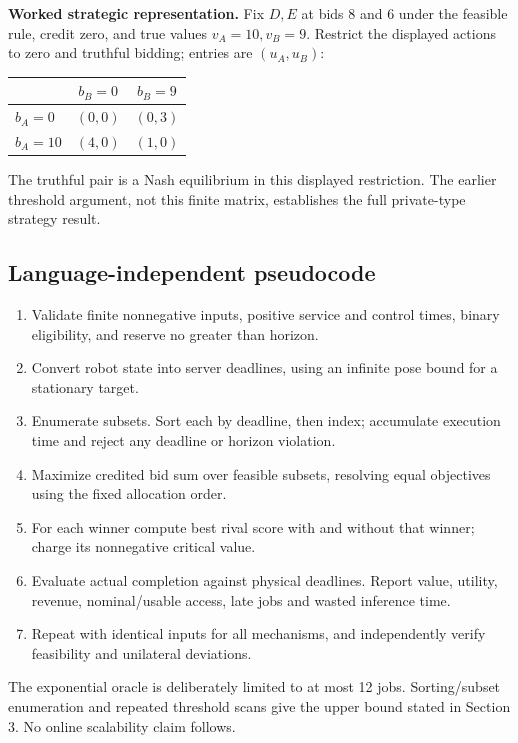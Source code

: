 \textbf{Worked strategic representation.} Fix $D,E$ at bids 8 and 6 under the feasible rule, credit zero, and true values $v_A=10,v_B=9$. Restrict the displayed actions to zero and truthful bidding; entries are $(u_A,u_B)$:
\begin{center}\begin{tabular}{lcc}\toprule
 & $b_B=0$ & $b_B=9$\\\midrule
$b_A=0$ & $(0,0)$ & $(0,3)$\\
$b_A=10$ & $(4,0)$ & $(1,0)$\\\bottomrule
\end{tabular}\end{center}
The truthful pair is a Nash equilibrium in this displayed restriction. The earlier threshold argument, not this finite matrix, establishes the full private-type strategy result.

\subsection{Language-independent pseudocode}
\begin{enumerate}
\item Validate finite nonnegative inputs, positive service and control times, binary eligibility, and reserve no greater than horizon.
\item Convert robot state into server deadlines, using an infinite pose bound for a stationary target.
\item Enumerate subsets. Sort each by deadline, then index; accumulate execution time and reject any deadline or horizon violation.
\item Maximize credited bid sum over feasible subsets, resolving equal objectives using the fixed allocation order.
\item For each winner compute best rival score with and without that winner; charge its nonnegative critical value.
\item Evaluate actual completion against physical deadlines. Report value, utility, revenue, nominal/usable access, late jobs and wasted inference time.
\item Repeat with identical inputs for all mechanisms, and independently verify feasibility and unilateral deviations.
\end{enumerate}
The exponential oracle is deliberately limited to at most 12 jobs. Sorting/subset enumeration and repeated threshold scans give the upper bound stated in Section 3. No online scalability claim follows.

